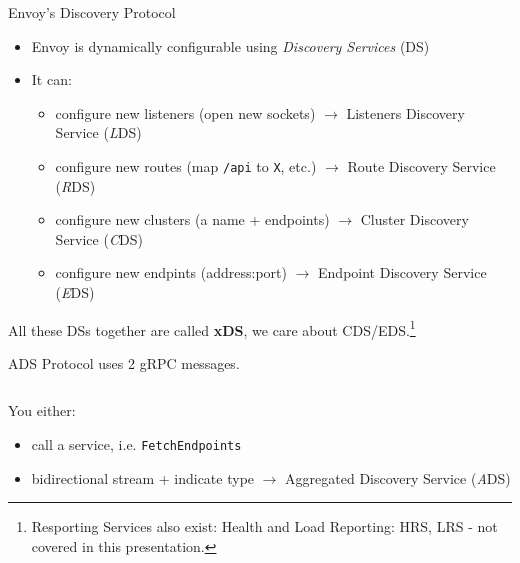 \documentclass[aspectratio=169]{beamer}
\begin{document}
    \begin{frame}{Envoy's Discovery Protocol}
        \begin{itemize}
            \item Envoy is dynamically configurable using \emph{Discovery Services} (DS)
            \item It can:
            \begin{itemize}
                \item configure new listeners (open new sockets) $\rightarrow$ Listeners Discovery Service (\emph{L}DS)
                \item configure new routes (map \texttt{/api} to \texttt{X}, etc.) $\rightarrow$ Route Discovery Service (\emph{R}DS)
                \item configure new clusters (a name + endpoints) $\rightarrow$ Cluster Discovery Service (\emph{C}DS)
                \item configure new endpints (address:port) $\rightarrow$ Endpoint Discovery Service (\emph{E}DS)
            \end{itemize}
        \end{itemize}

        All these DSs together are called {\bf xDS}, we care about CDS/EDS.\footnote{Resporting Services also exist: Health and Load
        Reporting: HRS, LRS - not covered in this presentation.}
    \end{frame}

    \begin{frame}{ADS}
        Protocol uses 2 gRPC messages.
        \begin{columns}[T]
            \begin{column}{0.5\textwidth}
                
            \end{column}
            \begin{column}{0.5\textwidth}
                
            \end{column}
        \end{columns}

        You either:

        \begin{itemize}
            \item call a service, i.e. \texttt{FetchEndpoints}
            \item bidirectional stream + indicate type $\rightarrow$ Aggregated Discovery Service (\emph{A}DS)
        \end{itemize}

    \end{frame}
\end{document}
